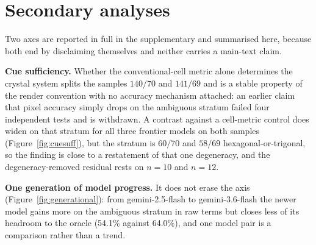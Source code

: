 \section{Secondary analyses}
\label{sec:secondary}

Two axes are reported in full in the supplementary and summarised here, because both end by disclaiming
themselves and neither carries a main-text claim.

\textbf{Cue sufficiency.} Whether the conventional-cell metric alone determines the crystal system splits
the samples $140/70$ and $141/69$ and is a stable property of the render convention with no accuracy
mechanism attached: an earlier claim that pixel accuracy simply drops on the ambiguous stratum failed four
independent tests and is withdrawn. A contrast against a cell-metric control does widen on that stratum for
all three frontier models on both samples (Figure~\ref{fig:cuesuff}), but the stratum is $60/70$ and
$58/69$ hexagonal-or-trigonal, so the finding is close to a restatement of that one degeneracy, and the
degeneracy-removed residual rests on $n=10$ and $n=12$.

\textbf{One generation of model progress.} It does not erase the axis (Figure~\ref{fig:generational}): from
gemini-2.5-flash to gemini-3.6-flash the newer model gains more on the ambiguous stratum in raw terms but
closes less of its headroom to the oracle (54.1\% against 64.0\%), and one model pair is a comparison
rather than a trend.
